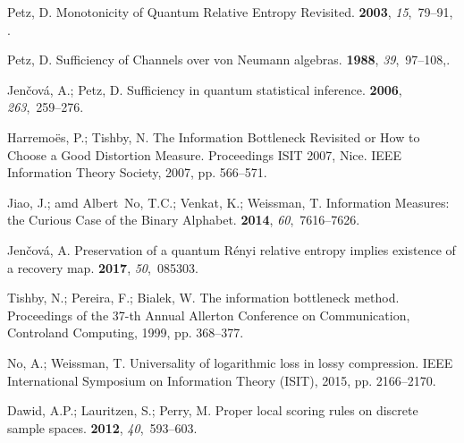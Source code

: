 \documentclass[10pt,a4paper,draft]{article}
\begin{document}
\begin{thebibliography}{-------}
Petz, D.
\newblock Monotonicity of Quantum Relative Entropy Revisited.
 {\bf 2003}, {\em 15},~79--91,
  \href{http://xxx.lanl.gov/abs/http://www.worldscientific.com/doi/pdf/10.1142/S0129055X03001576}{{}}.

Petz, D.
\newblock Sufficiency of Channels over von {N}eumann algebras.
 {\bf 1988}, {\em 39},~97--108,.

Jen{\v c}ov{\'a}, A.; Petz, D.
\newblock Sufficiency in quantum statistical inference.
 {\bf 2006}, {\em
  263},~259--276.

Harremo{\"e}s, P.; Tishby, N.
\newblock The Information Bottleneck Revisited or How to Choose a Good
  Distortion Measure.
\newblock  Proceedings ISIT 2007, Nice. IEEE Information Theory Society,  2007,
  pp. 566--571.

Jiao, J.; amd Albert~No, T.C.; Venkat, K.; Weissman, T.
\newblock Information Measures: the Curious Case of the Binary Alphabet.
 {\bf 2014}, {\em 60},~7616--7626.

Jen{\v c}ov{\'a}, A.
\newblock Preservation of a quantum {R}{\'e}nyi relative entropy implies
  existence of a recovery map.
 {\bf 2017},
  {\em 50},~085303.

Tishby, N.; Pereira, F.; Bialek, W.
\newblock The information bottleneck method.
\newblock  Proceedings of the 37-th Annual Allerton Conference on
  Communication, Controland Computing,  1999, pp. 368--377.

No, A.; Weissman, T.
\newblock Universality of logarithmic loss in lossy compression.
 IEEE International Symposium on Information Theory (ISIT),
  2015, pp. 2166--2170.

Dawid, A.P.; Lauritzen, S.; Perry, M.
\newblock Proper local scoring rules on discrete sample spaces.
 {\bf 2012}, {\em 40},~593--603.


\end{thebibliography}
\end{document}
